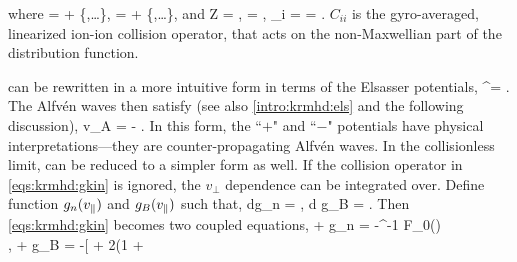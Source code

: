    where 
    \beq
         =  + \lt\{\Phi,\ldots\rt\}, \quad {}\cdot\nabla =
         + \lt\{\Psi,\ldots\rt\},\label{eqs:krmhd:convder}
    \eeq
    and
    \beq
        Z = , \quad \tau = , \quad \beta_i =
         = .
    \eeq
    $C_{ii}$ is the gyro-averaged, linearized ion-ion collision operator, that acts on the non-Maxwellian part of
    the distribution function.

     can be rewritten in a more intuitive form in terms of the Elsasser potentials,
    \beq
        \xi^\pm = \Phi \pm \Psi.
    \eeq
    The Alfv\'{e}n waves then satisfy (see also \eqref{intro:krmhd:els} and the following
    discussion),
    \beq
     \mp v_A  = -  . \label{eqs:krmhd:els} 
    \eeq
    In this form, the ``$+$" and ``$-$" potentials have physical interpretations---they are
    counter-propagating Alfv\'{e}n waves.
%
    In the collisionless limit,  can be reduced
    to a simpler form as well. If the collision operator in \eqref{eqs:krmhd:gkin} is ignored,
    the $v_\perp$ dependence can be integrated over. Define function $g_n(v_\parallel)$ and
    $g_B(v_\parallel)$ such that,
    \beq
        \int d\vpar g_n = , \quad \int d \vpar g_B =
        . \label{eqs:eq:gnBdef}
    \eeq
    Then \eqref{eqs:krmhd:gkin} becomes two coupled equations,
    \bea
         + \vpar {}\cdot \nabla g_n = -^{-1} \vpar F_0(\vpar) \nonumber \\
        \times {}\cdot \nabla
        ,\label{eqs:krmhd:gn}
    \eea
    \bea
         + \vpar {}\cdot \nabla g_B = -\lt[ + 2\lt(1 +
